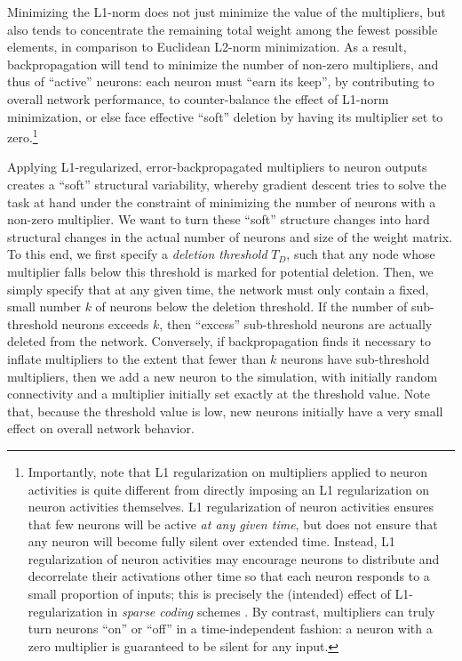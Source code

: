 \documentclass{article}
\begin{document}
Minimizing the L1-norm does not just minimize the value of the multipliers, but
also tends to concentrate the remaining total weight among the fewest possible
elements, in comparison to Euclidean L2-norm minimization.  As a result,
backpropagation will tend to minimize the number of non-zero multipliers, and
thus of ``active'' neurons: each neuron must ``earn its keep'', by contributing
to overall network performance, to counter-balance the effect of L1-norm
minimization, or else face effective ``soft'' deletion by having its multiplier
set to zero.\footnote{Importantly, note that L1 regularization on multipliers
    applied to neuron activities is quite different from directly imposing an
    L1 regularization on neuron activities themselves. L1 regularization of
    neuron activities ensures that few neurons will be active \textit{at any
    given time}, but does not ensure that any neuron will become fully silent
    over extended time.  Instead, L1 regularization of neuron activities may
    encourage neurons to distribute and decorrelate their activations other
    time so that each neuron responds to a small proportion of inputs; this is
    precisely the (intended) effect of L1-regularization in \textit{sparse
coding} schemes \cite{Olshausen1996-vz}. By contrast, multipliers can truly
turn neurons ``on'' or ``off'' in a time-independent fashion: a neuron with a
zero multiplier is guaranteed to be silent for any input. }

Applying L1-regularized, error-backpropagated multipliers to neuron outputs creates a ``soft''
structural variability, whereby gradient descent tries to solve the task at
hand under the constraint of minimizing the number of neurons with a non-zero
multiplier. We want to turn these ``soft'' structure changes into hard
structural changes in the actual number of neurons and size of the weight
matrix. To this end, we first specify a \textit{deletion threshold} $T_D$, such
that any node whose multiplier falls below this threshold is marked for
potential deletion. Then, we simply specify that at any given time, the network
must only contain a fixed, small number $k$ of neurons below the deletion
threshold. If the number of sub-threshold neurons exceeds $k$, then ``excess''
sub-threshold neurons are actually deleted from the network.  Conversely, if
backpropagation finds it necessary to inflate multipliers to the extent that
fewer than $k$ neurons have sub-threshold multipliers, then we add a new neuron
to the simulation, with initially random connectivity and a multiplier
initially set exactly at the threshold value. Note that, because the threshold
value is low, new neurons initially have a very small effect on overall network
behavior.
\end{document}
